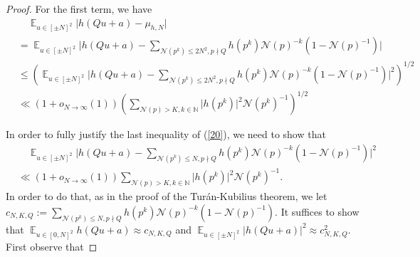 \documentclass[11pt]{amsart}
\theoremstyle{definition}
\DeclareMathOperator*{\E}{\mathbb{E}}
\newcommand{\N}{{\mathbb N}}
\newcommand{\NN}{{\mathcal N}}
\newcommand{\Z}{{\mathbb Z}}
\begin{document}
\begin{proof}
For the first term,
we have 
\begin{equation}\label{20}
    \begin{split}
        &\quad \E_{u\in[ \pm N]^{2}}\vert h(Qu+a)-\mu_{h,N}\vert 
        \\&=\E_{u\in[\pm N]^{2}}\vert h(Qu+a)-\sum_{\NN(p^{k})\leq 2N^{2}, p\nmid Q}h(p^{k})\NN(p)^{-k}(1-\NN(p)^{-1})\vert
        \\&\leq \left(\E_{u\in[\pm N]^{2}}\vert h(Qu+a)-\sum_{\NN(p^{k})\leq 2N^{2},p\nmid Q}h(p^{k})\NN(p)^{-k}(1-\NN(p)^{-1})\vert^{2}\right)^{1/2}
        \\&\ll (1+o_{N\to\infty}(1)) \left(\sum_{\NN(p)>K, k\in\N}\vert h(p^{k})\vert^{2}\NN(p^{k})^{-1}\right)^{1/2}
    \end{split}
\end{equation}







{\color{red}

In order to fully justify the last inequality of (\ref{20}), we need to show that
\begin{equation}
    \begin{split}
        &\quad \E_{u\in [\pm N]^2}\vert h(Qu+a)-\sum_{\NN(p^{k})\leq N,p\nmid Q}h(p^{k})\NN(p)^{-k}(1-\NN(p)^{-1})\vert^{2}
        \\&\ll (1+o_{N\to\infty}(1)) \sum_{\NN(p)>K, k\in\N}\vert h(p^{k})\vert^{2}\NN(p^{k})^{-1}.
    \end{split}
\end{equation}
In order to do that, as in the proof of the Tur\'an-Kubilius theorem, we let $c_{N,K,Q}:=\sum_{ \NN(p^{k})\leq N,p\nmid Q}h(p^{k})\NN(p)^{-k}(1-\NN(p)^{-1})$. It suffices to show that 
$\E_{u\in [0,N]^2}h(Qu+a)\approx c_{N,K,Q}$ and $\E_{u\in [\pm N]^2}\vert h(Qu+a)\vert^{2}\approx c_{N,K,Q}^{2}$.
First observe that

}
\end{proof}
\end{document}
